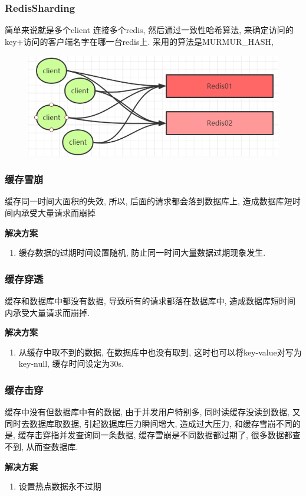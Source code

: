 \documentclass[UTF8]{ctexart}
\begin{document}
\subsubsection{RedisSharding}
简单来说就是多个client 连接多个redis, 然后通过一致性哈希算法, 来确定访问的key+访问的客户端名字在哪一台redis上.
采用的算法是MURMUR\_HASH, 
\begin{figure}
	\centering
	\includegraphics[width=0.7\linewidth]{figures/redis_sharding.png}
	\caption{}
	\label{fig:redissharding}
\end{figure}
\subsubsection{缓存雪崩}
缓存同一时间大面积的失效, 所以, 后面的请求都会落到数据库上, 造成数据库短时间内承受大量请求而崩掉

\par
\textbf{解决方案}
\begin{enumerate}
	
	\item 缓存数据的过期时间设置随机, 防止同一时间大量数据过期现象发生.

\end{enumerate}

\subsubsection{缓存穿透}
缓存和数据库中都没有数据, 导致所有的请求都落在数据库中, 造成数据库短时间内承受大量请求而崩掉.
\par
\textbf{解决方案}
\begin{enumerate}
	
	\item 从缓存中取不到的数据, 在数据库中也没有取到, 这时也可以将key-value对写为key-null, 缓存时间设定为30s.
	
\end{enumerate}

\subsubsection{缓存击穿}
缓存中没有但数据库中有的数据, 由于并发用户特别多, 同时读缓存没读到数据, 又同时去数据库取数据, 引起数据库压力瞬间增大, 造成过大压力, 和缓存雪崩不同的是, 缓存击穿指并发查询同一条数据, 缓存雪崩是不同数据都过期了, 很多数据都查不到, 从而查数据库.
\par
\textbf{解决方案}
\begin{enumerate}
	\item 设置热点数据永不过期	
\end{enumerate}
\end{document}
